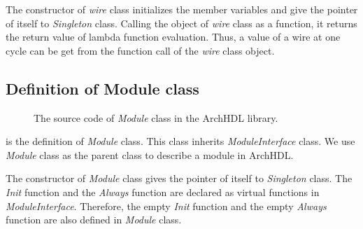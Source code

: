 The constructor of \textit{wire} class initializes the member variables and give the pointer of itself to \textit{Singleton} class.
Calling the object of \textit{wire} class as a function, it returns the return value of lambda function evaluation.
Thus, a value of a wire at one cycle can be get from the function call of the \textit{wire} class object.

\subsection{Definition of Module class}

\begin{figure}[t]
 
 \caption{The source code of \textit{Module} class in the ArchHDL library.}
 \label{src:module}
\end{figure}

 is the definition of \textit{Module} class.
This class inherits \textit{ModuleInterface} class.
We use \textit{Module} class as the parent class to describe a module in ArchHDL.

The constructor of \textit{Module} class gives the pointer of itself to \textit{Singleton} class.
The \textit{Init} function and the \textit{Always} function are declared as virtual functions in \textit{Module\-Interface}.
Therefore, the empty \textit{Init} function and the empty \textit{Always} function are also defined in \textit{Module} class.
